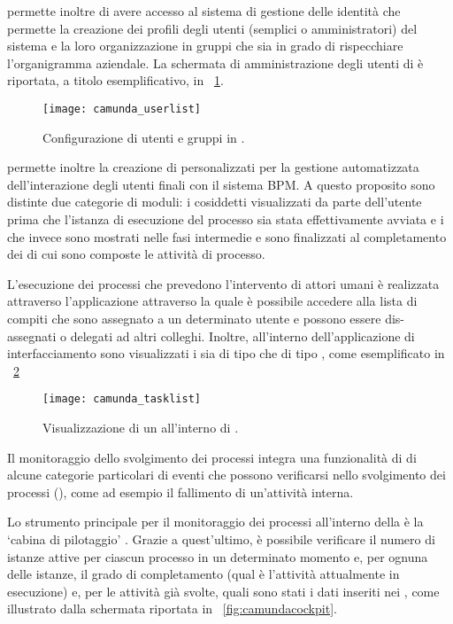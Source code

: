  permette inoltre di avere accesso al sistema di gestione delle identità che permette la creazione dei profili degli utenti (semplici o amministratori) del sistema e la loro organizzazione in gruppi che sia in grado di rispecchiare l'organigramma aziendale. La schermata di amministrazione degli utenti di \progname è riportata, a titolo esemplificativo, in \figurename~\ref{fig:comundauserlist}.

\begin{figure}[H]
  \centering
  \texttt{[image: camunda\_userlist]}
  \caption{Configurazione di utenti e gruppi in .}
  \label{fig:comundauserlist}
\end{figure}

\progname permette inoltre la creazione di  personalizzati per la gestione automatizzata dell'interazione degli utenti finali con il sistema BPM\@. A questo proposito sono distinte due categorie di moduli: i cosiddetti  visualizzati da parte dell'utente prima che l'istanza di esecuzione del processo sia stata effettivamente avviata e i  che invece sono mostrati nelle fasi intermedie e sono finalizzati al completamento dei  di cui sono composte le attività di processo.

L'esecuzione dei processi che prevedono l'intervento di attori umani è realizzata attraverso l'applicazione  attraverso la quale è possibile accedere alla lista di compiti che sono assegnato a un determinato utente e possono essere dis-assegnati o delegati ad altri colleghi. Inoltre, all'interno dell'applicazione di interfacciamento sono visualizzati i  sia di tipo  che di tipo , come esemplificato in \figurename~\ref{fig:camundatasklist}

\begin{figure}[H]
  \centering
  \texttt{[image: camunda\_tasklist]}
  \caption{Visualizzazione di un  all'interno di .}
  \label{fig:camundatasklist}
\end{figure}

Il monitoraggio dello svolgimento dei processi integra una funzionalità di  di alcune categorie particolari di eventi che possono verificarsi nello svolgimento dei processi (), come ad esempio il fallimento di un'attività interna.

Lo strumento principale per il monitoraggio dei processi all'interno della  \progname è la `cabina di pilotaggio' . Grazie a quest'ultimo, è possibile verificare il numero di istanze attive per ciascun processo in un determinato momento e, per ognuna delle istanze, il grado di completamento (qual è l'attività attualmente in esecuzione) e, per le attività già svolte, quali sono stati i dati inseriti nei , come illustrato dalla schermata riportata in \figurename~\ref{fig:camundacockpit}.

